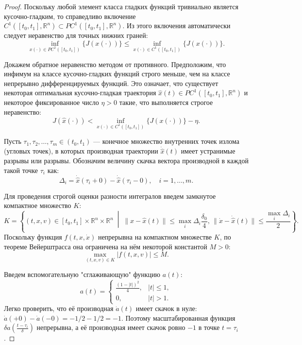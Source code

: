 \begin{proof}
Поскольку любой элемент класса гладких функций тривиально является кусочно-гладким, то справедливо включение $C^1([t_0, t_1], \mathbb{R}^n) \subset PC^1([t_0, t_1], \mathbb{R}^n)$. Из этого включения автоматически следует неравенство для точных нижних граней:
\begin{equation}\label{eq::inf_trivial}
    \inf_{x(\cdot) \in PC^1([t_0, t_1])} \{ J(x(\cdot)) \} \le \inf_{x(\cdot) \in C^1([t_0, t_1])} \{ J(x(\cdot)) \}.
\end{equation}

Докажем обратное неравенство методом от противного. Предположим, что инфимум на классе кусочно-гладких функций строго меньше, чем на классе непрерывно дифференцируемых функций.
Это означает, что существует некоторая оптимальная кусочно-гладкая траектория $\hat{x}(t) \in PC^1([t_0, t_1], \mathbb{R}^n)$ и некоторое фиксированное число $\eta > 0$ такие, 
что выполняется строгое неравенство:
\begin{equation}\label{eq::contr_hyp}
    J(\hat{x}(\cdot)) < \inf_{x(\cdot) \in C^1([t_0, t_1])} \{ J(x(\cdot)) \} - \eta.
\end{equation}

Пусть $\tau_1, \tau_2, \dots, \tau_m \in (t_0, t_1)$ --- конечное множество внутренних точек излома (угловых точек), 
в которых производная траектории $\dot{\hat{x}}(t)$ имеет устранимые разрывы или разрывы. Обозначим величину скачка вектора производной в каждой такой точке $\tau_i$ как:
\begin{equation}
    \Delta_i = \dot{\hat{x}}(\tau_i + 0) - \dot{\hat{x}}(\tau_i - 0), \quad i = 1, \dots, m.
\end{equation}

Для проведения строгой оценки разности интегралов введем замкнутое компактное множество $K$:
\begin{equation}
  K = \left\{ (t, x, v) \in [t_0, t_1] \times \mathbb{R}^n \times \mathbb{R}^n \;\middle|\; \|x - \hat{x}(t)\| \le \max_i{\Delta_i \frac{\delta_0}{4}}, \, \|\dot{x} - \dot{\hat{x}}(t)\| \le \frac{\max_i{\Delta_i}}{2} \right\}.
\end{equation}
Поскольку функция $f(t, x, \dot{x})$ непрерывна на компактном множестве $K$, по теореме Вейерштрасса она ограничена на нём некоторой константой $M > 0$:
\begin{equation}
    \max_{(t, x, v) \in K} |f(t, x, v)| \le M.
\end{equation}

Введем вспомогательную "сглаживающую" функцию $a(t)$:
\begin{equation}
    a(t) = 
    \begin{cases} 
    \frac{(1 - |t|)^2}{4}, & |t| \le 1, \\ 
    0, & |t| > 1. 
    \end{cases}
\end{equation}
Легко проверить, что её производная $\dot{a}(t)$ имеет скачок в нуле: $\dot{a}(+0) - \dot{a}(-0) = -1/2 - 1/2 = -1$. 
Поэтому масштабированная функция $\delta a\left(\frac{t - \tau_i}{\delta}\right)$ непрерывна, а её производная имеет скачок ровно $-1$ в точке $t = \tau_i$.


\end{proof}
